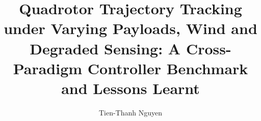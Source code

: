 \documentclass[nocompress]{spie}
\title{Quadrotor Trajectory Tracking under Varying Payloads, Wind and Degraded
Sensing: A Cross-Paradigm Controller Benchmark and Lessons Learnt}
\author{Tien-Thanh Nguyen\supit{a}}
\affiliation{\supit{a}Affiliation, Street, City, Country}
\begin{document}
\maketitle








\acknowledgments



\end{document}
